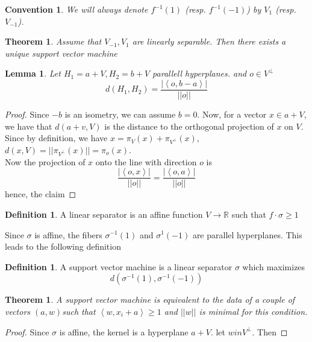 \documentclass{book}
\theoremstyle{plain}
\newtheorem{convention}[corollary]{Convention}
\newtheorem{theorem}[corollary]{Theorem}
\newtheorem{lemma}[corollary]{Lemma}
\theoremstyle{definition}
\newtheorem{definition}[corollary]{Definition}
\newcommand{\bl}[2]{\left\langle #1,#2\right\rangle}
\renewcommand{\d}[1]{\mathbb{#1}}
\newcommand{\mor}{\longrightarrow}
\begin{document}
\begin{convention}
	We will always denote $f^{-1}(1)$ (resp. $f^{-1}(-1)$) by $V_1$ (resp. $V_{-1}$).
\end{convention}





\begin{theorem}
Assume that $V_{-1}, V_1	$ are linearly separable. Then there exists a unique support vector machine
\end{theorem}



\begin{lemma}
Let $H_1=a+V, H_2=b+V$ parallell hyperplanes. and $o \in V^{\perp}$
\[
d(H_1,H_2)=\frac{\vert \bl{o}{b-a}\vert}{\vert\vert o\vert \vert}
\] 	
\end{lemma}

\begin{proof}
Since $-b$ is an isometry, we can assume $b=0$. Now, for a vector $x\in a+V$, we have that $d(a+v,V)$	 is the distance to the orthogonal projection of $x$ on $V$. Since by definition, we have $x=\pi_V(x)+\pi_{V^\perp}(x)$, $d(x,V)=\vert \vert \pi_{V^{\perp}}(x)\vert\vert=\pi_{o}(x)$.\\
Now the projection of $x$ onto the line with direction $o$ is
\[
\frac{\vert \bl{o}{x}\vert}{\vert \vert o\vert \vert}=\frac{\vert \bl{o}{a}\vert}{\vert \vert o\vert \vert}\]
hence, the claim
\end{proof}


\begin{definition}
A linear separator is an affine function $V\mor \d{R}$ such that $f\cdot \sigma \ge 1$
\end{definition}

Since $\sigma$ is affine, the fibers $\sigma^{-1}(1)$ and $\sigma^{1}(-1)$ are parallel hyperplanes. This leads to the following definition

\begin{definition}
A support vector machine is a linear separator $\sigma$ which maximizes
\[
d(\sigma^{-1}(1),\sigma^{-1}(-1))
\]	
\end{definition}

\begin{theorem}
A support vector machine is equivalent to the data of a couple of vectors $(a,w)$such that $\bl{w}{x_i+a}\ge 1$ and $\vert \vert w\vert \vert$ is minimal	for this condition.
\end{theorem}

\begin{proof}
Since $\sigma$ is affine, the kernel is a hyperplane $a+V$. let $w in V^{\perp}$. Then	
\end{proof}
\end{document}
